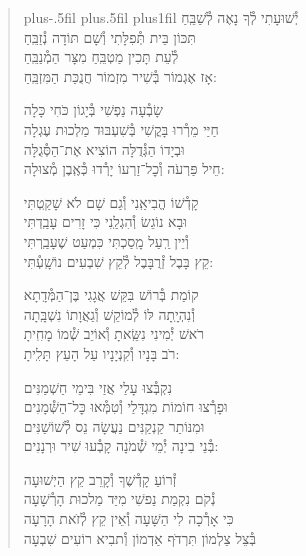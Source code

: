 \documentclass[twoside, openany, parskip=half, 11pt]{book}
\begin{document}
\begin{quote}
\leftskip=0pt plus-.5fil
\rightskip=0pt plus.5fil
\parfillskip=0pt plus1fil
יְ֯שׁוּעָתִי \hfill לְ֯ךָ נָאֶה לְ֯שַׁבֵּֽחַ \\ תִּכּוֹן בֵּית תְּ֯פִלָּתִי \hfill וְ֯שָׁם תּוֹדָה נְ֯זַבֵּֽחַ \\
לְ֯עֵת תָּכִין מַטְבֵּֽחַ \hfill מִצָּר הַמְ֯נַבֵּֽחַ \\ אָז אֶגְמוֹר בְּ֯שִׁיר מִזְמוֹר \hfill חֲנֻכַּת הַמִּזְבֵּֽחַ:

שָׂבְ֯עָה נַפְשִׁי \hfill בְּ֯יָגוֹן כֹּחִי כָּלָה \\ חַיַּי מֵרְ֯רוּ בָּקֳשִׁי \hfill בְּ֯שִׁעְבּוּד מַלְכוּת עֶגְלָה \\
וּבְיָדוֹ הַגְּ֯דֻלָּה \hfill הוֹצִיא אֶת־הַסְּ֯גֻלָּה \\ חֵיל פַּרְעֹה וְ֯כׇל־זַרְעוֹ \hfill יָרְ֯דוּ כְּ֯אֶֽבֶן מְ֯צוּלָה:

קָדְ֯שׁוֹ הֱבִיאַֽנִי \hfill וְ֯גַם שָׁם לֹא שָׁקַֽטְתִּי \\ וּבָא נוֹגֵשׂ וְ֯הִגְלַֽנִי \hfill כִּי זָרִים עָבַֽדְתִּי \\
וְ֯יֵין רַֽעַל מָֽסַכְתִּי \hfill כִּמְעַט שֶׁעָבַֽרְתִּי \\ קֵץ בָּבֶל זְ֯רֻבָּבֶל \hfill לְ֯קֵץ שִׁבְעִים נוֹשָֽׁעְ֯תִּי:

קוֹמַת בְּ֯רוֹשׁ בִּקֵּשׁ \hfill אֲגָגִי בֶּן־הַמְּ֯דָֽתָא \\ וְ֯נִהְיָֽתָה לּוֹ לְ֯מוֹקֵשׁ \hfill וְ֯גַאֲוָתוֹ נִשְׁבָּֽתָה \\
רֹאשׁ יְ֯מִינִי נִשֵּֽׂאתָ \hfill וְ֯אוֹיֵב שְׁ֯מוֹ מָחִֽיתָ \\ רֹב בָּנָיו וְ֯קִנְיָנָיו \hfill עַל הָעֵץ תָּלִֽיתָ:

נִקְבְּ֯צוּ עָלַי \hfill אֲזַי בִּימֵי חַשְׁמַנִּים \\ וּפָרְ֯צוּ חוֹמוֹת מִגְדָּלַי \hfill וְ֯טִמְּ֯אוּ כׇּל־הַשְּׁ֯מָנִים \\
וּמִנּוֹתַר קַנְקַנִּים \hfill נַעֲשָׂה נֵס לְ֯שׁוֹשַׁנִּים \\ בְּ֯נֵי בִינָה יְ֯מֵי שְׁ֯מֹנָה \hfill קָבְ֯עוּ שִׁיר וּרְנָנִים:


זְ֯רוֹעַ קָדְ֯שֶׁךָ \hfill וְ֯קָרֵב קֵץ הַיְשׁוּעָה\\
נְ֯קֹם נִקְמַת נַפשִׁי \hfill מִיַּד מַלכוּת הָרְ֯שָׁעָה\\
כִּי אָרְ֯כָה לִי הַשָּׁעָה \hfill וְ֯אֵין קֵץ לְ֯זׂאת הָרָעָה\\
בְּ֯צֵל צַלְמוֹן תִּרְדּׂף אַדְמוֹן \hfill וְ֯תבִיא רוֹעִים שִׁבְעָה

\end{quote}
\end{document}
